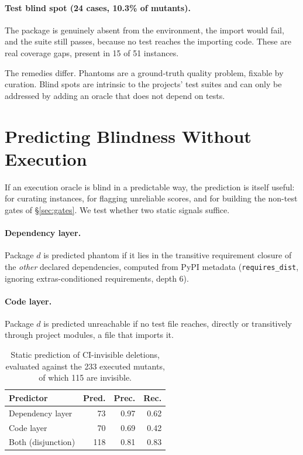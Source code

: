 \documentclass[11pt]{article}
\newcommand{\code}[1]{\texttt{\small #1}}
\begin{document}
\paragraph{Test blind spot (24 cases, 10.3\% of mutants).}
The package is genuinely absent from the environment, the import would fail, and the suite still passes, because no test reaches the importing code.
These are real coverage gaps, present in 15 of 51 instances.

The remedies differ.
Phantoms are a ground-truth quality problem, fixable by curation.
Blind spots are intrinsic to the projects' test suites and can only be addressed by adding an oracle that does not depend on tests.

\section{Predicting Blindness Without Execution}
\label{sec:predictor}

If an execution oracle is blind in a predictable way, the prediction is itself useful: for curating instances, for flagging unreliable scores, and for building the non-test gates of \S\ref{sec:gates}.
We test whether two static signals suffice.

\paragraph{Dependency layer.}
Package $d$ is predicted phantom if it lies in the transitive requirement closure of the \emph{other} declared dependencies, computed from PyPI metadata (\code{requires\_dist}, ignoring extras-conditioned requirements, depth 6).

\paragraph{Code layer.}
Package $d$ is predicted unreachable if no test file reaches, directly or transitively through project modules, a file that imports it.

\begin{table}[t]
  \centering
  \begin{tabular}{lrrr}
    \hline
    \textbf{Predictor} & \textbf{Pred.} & \textbf{Prec.} & \textbf{Rec.} \\
    \hline
    Dependency layer & 73 & 0.97 & 0.62 \\
    Code layer & 70 & 0.69 & 0.42 \\
    Both (disjunction) & 118 & 0.81 & 0.83 \\
    \hline
  \end{tabular}
  \caption{Static prediction of CI-invisible deletions, evaluated against the 233 executed mutants, of which 115 are invisible.}
  \label{tab:predictor}
\end{table}
\end{document}
